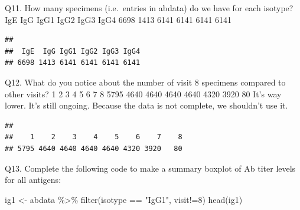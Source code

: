 \documentclass[
]{article}
\newenvironment{Shaded}{\begin{snugshade}}{\end{snugshade}}
\newcommand{\DecValTok}[1]{\textcolor[rgb]{0.00,0.00,0.81}{#1}}
\newcommand{\FunctionTok}[1]{\textcolor[rgb]{0.00,0.00,0.00}{#1}}
\newcommand{\NormalTok}[1]{#1}
\newcommand{\OtherTok}[1]{\textcolor[rgb]{0.56,0.35,0.01}{#1}}
\newcommand{\SpecialCharTok}[1]{\textcolor[rgb]{0.00,0.00,0.00}{#1}}
\newcommand{\StringTok}[1]{\textcolor[rgb]{0.31,0.60,0.02}{#1}}
\begin{document}
Q11. How many specimens (i.e.~entries in abdata) do we have for each
isotype? IgE IgG IgG1 IgG2 IgG3 IgG4 6698 1413 6141 6141 6141 6141

\begin{Shaded}
\end{Shaded}

\begin{verbatim}
## 
##  IgE  IgG IgG1 IgG2 IgG3 IgG4 
## 6698 1413 6141 6141 6141 6141
\end{verbatim}

Q12. What do you notice about the number of visit 8 specimens compared
to other visits? 1 2 3 4 5 6 7 8 5795 4640 4640 4640 4640 4320 3920 80
It's way lower. It's still ongoing. Because the data is not complete, we
shouldn't use it.

\begin{Shaded}
\end{Shaded}

\begin{verbatim}
## 
##    1    2    3    4    5    6    7    8 
## 5795 4640 4640 4640 4640 4320 3920   80
\end{verbatim}

Q13. Complete the following code to make a summary boxplot of Ab titer
levels for all antigens:

\begin{Shaded}
\begin{Highlighting}[]
\NormalTok{ig1 }\OtherTok{\textless{}{-}}\NormalTok{ abdata }\SpecialCharTok{\%\textgreater{}\%} \FunctionTok{filter}\NormalTok{(isotype }\SpecialCharTok{==} \StringTok{"IgG1"}\NormalTok{, visit}\SpecialCharTok{!=}\DecValTok{8}\NormalTok{)}
\FunctionTok{head}\NormalTok{(ig1)}
\end{Highlighting}
\end{Shaded}
\end{document}
